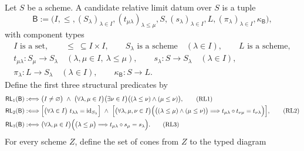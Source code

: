 \begin{definition}
  \label{def:nagata-relative-limit-datum}

  Let $S$ be a scheme.  A candidate relative limit datum over $S$ is a tuple
  \[
    \mathsf B
      :=\bigl(
        I,\leq,(S_\lambda)_{\lambda\in I},
        (t_{\mu\lambda})_{\lambda\leq\mu},
        S,(s_\lambda)_{\lambda\in I},
        L,(\pi_\lambda)_{\lambda\in I},\kappa_{\mathsf B}
        \bigr),                                                    \tag{RL0}
  \]
  with component types
  \[
  \begin{gathered}
    I\text{ is a set},\qquad {\leq}\ \subseteq I\times I,\qquad
    S_\lambda\text{ is a scheme}\quad(\lambda\in I),\qquad
    L\text{ is a scheme},\\
    t_{\mu\lambda}\colon S_\mu\to S_\lambda
      \quad(\lambda,\mu\in I,\ \lambda\leq\mu),\qquad
    s_\lambda\colon S\to S_\lambda\quad(\lambda\in I),\\
    \pi_\lambda\colon L\to S_\lambda\quad(\lambda\in I),\qquad
    \kappa_{\mathsf B}\colon S\to L.
  \end{gathered}
  \]
  Define the first three structural predicates by
  \begin{align}
    \mathsf{RL}_1(\mathsf B)
      &:\Longleftrightarrow
      \bigl(I\neq\varnothing\bigr)\ \wedge\
      \bigl(\forall\lambda,\mu\in I\bigr)
      \bigl(\exists\nu\in I\bigr)
        \bigl((\lambda\leq\nu)\wedge(\mu\leq\nu)\bigr),             \tag{RL1}\\
    \mathsf{RL}_2(\mathsf B)
      &:\Longleftrightarrow
      \Bigl[
        \bigl(\forall\lambda\in I\bigr)\
          t_{\lambda\lambda}=\operatorname{id}_{S_\lambda}
      \Bigr]
      \ \wedge\
      \Bigl[
        \bigl(\forall\lambda,\mu,\nu\in I\bigr)
        \Bigl(
          \bigl((\lambda\leq\mu)\wedge(\mu\leq\nu)\bigr)
          \Longrightarrow
          t_{\mu\lambda}\circ t_{\nu\mu}=t_{\nu\lambda}
        \Bigr)
      \Bigr],                                                       \tag{RL2}\\
    \mathsf{RL}_3(\mathsf B)
      &:\Longleftrightarrow
      \bigl(\forall\lambda,\mu\in I\bigr)
      \Bigl(
        \bigl(\lambda\leq\mu\bigr)
        \Longrightarrow t_{\mu\lambda}\circ s_\mu=s_\lambda
      \Bigr).                                                       \tag{RL3}
  \end{align}
  For every scheme $Z$, define the set of cones from $Z$ to the typed diagram

\end{definition}
